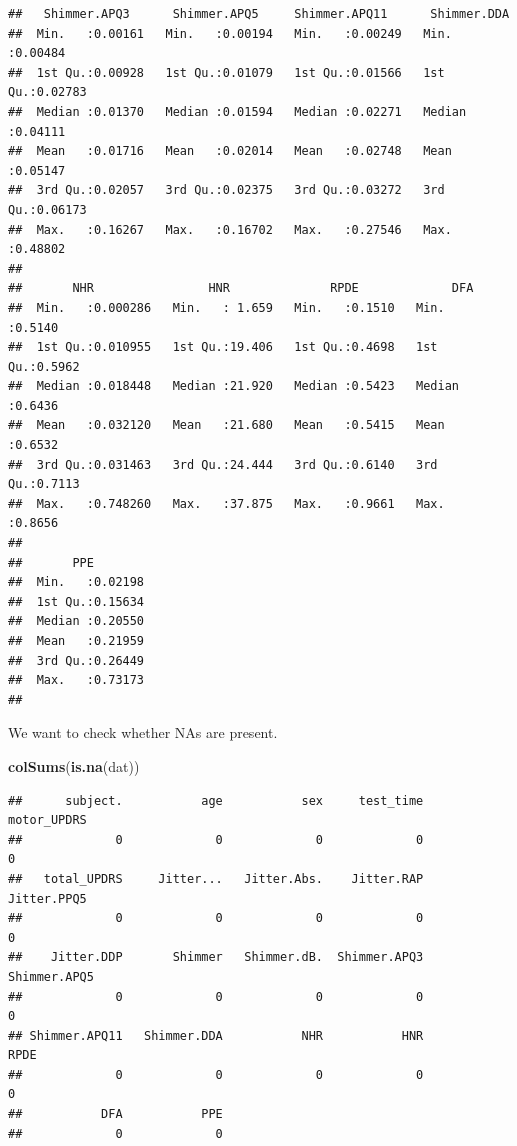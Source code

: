\documentclass[
]{article}
\newenvironment{Shaded}{\begin{snugshade}}{\end{snugshade}}
\newcommand{\FunctionTok}[1]{\textcolor[rgb]{0.13,0.29,0.53}{\textbf{#1}}}
\newcommand{\NormalTok}[1]{#1}
\begin{document}
\begin{verbatim}
##   Shimmer.APQ3      Shimmer.APQ5     Shimmer.APQ11      Shimmer.DDA     
##  Min.   :0.00161   Min.   :0.00194   Min.   :0.00249   Min.   :0.00484  
##  1st Qu.:0.00928   1st Qu.:0.01079   1st Qu.:0.01566   1st Qu.:0.02783  
##  Median :0.01370   Median :0.01594   Median :0.02271   Median :0.04111  
##  Mean   :0.01716   Mean   :0.02014   Mean   :0.02748   Mean   :0.05147  
##  3rd Qu.:0.02057   3rd Qu.:0.02375   3rd Qu.:0.03272   3rd Qu.:0.06173  
##  Max.   :0.16267   Max.   :0.16702   Max.   :0.27546   Max.   :0.48802  
##                                                                         
##       NHR                HNR              RPDE             DFA        
##  Min.   :0.000286   Min.   : 1.659   Min.   :0.1510   Min.   :0.5140  
##  1st Qu.:0.010955   1st Qu.:19.406   1st Qu.:0.4698   1st Qu.:0.5962  
##  Median :0.018448   Median :21.920   Median :0.5423   Median :0.6436  
##  Mean   :0.032120   Mean   :21.680   Mean   :0.5415   Mean   :0.6532  
##  3rd Qu.:0.031463   3rd Qu.:24.444   3rd Qu.:0.6140   3rd Qu.:0.7113  
##  Max.   :0.748260   Max.   :37.875   Max.   :0.9661   Max.   :0.8656  
##                                                                       
##       PPE         
##  Min.   :0.02198  
##  1st Qu.:0.15634  
##  Median :0.20550  
##  Mean   :0.21959  
##  3rd Qu.:0.26449  
##  Max.   :0.73173  
## 
\end{verbatim}

We want to check whether NAs are present.

\begin{Shaded}
\begin{Highlighting}[]
\FunctionTok{colSums}\NormalTok{(}\FunctionTok{is.na}\NormalTok{(dat))}
\end{Highlighting}
\end{Shaded}

\begin{verbatim}
##      subject.           age           sex     test_time   motor_UPDRS 
##             0             0             0             0             0 
##   total_UPDRS     Jitter...   Jitter.Abs.    Jitter.RAP   Jitter.PPQ5 
##             0             0             0             0             0 
##    Jitter.DDP       Shimmer   Shimmer.dB.  Shimmer.APQ3  Shimmer.APQ5 
##             0             0             0             0             0 
## Shimmer.APQ11   Shimmer.DDA           NHR           HNR          RPDE 
##             0             0             0             0             0 
##           DFA           PPE 
##             0             0
\end{verbatim}
\end{document}

